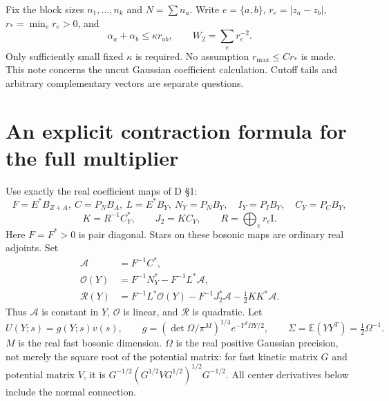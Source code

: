 \documentclass[11pt,letterpaper]{article}
\newcommand{\E}{\mathbb E}
\newcommand{\calA}{\mathcal A}
\newcommand{\calO}{\mathcal O}
\newcommand{\calR}{\mathcal R}
\newcommand{\Id}{\mathrm I}
\begin{document}
Fix the block sizes $n_1,\ldots,n_k$ and $N=\sum n_a$. Write $e=\{a,b\}$, $r_e=|z_a-z_b|$, $r_*=\min_e r_e>0$, and
\[
 \alpha_a+\alpha_b\le\kappa r_{ab},\qquad W_2=\sum_e r_e^{-2}.
\]
Only sufficiently small fixed $\kappa$ is required. No assumption $r_{\max}\le C r_*$ is made. This note concerns the uncut Gaussian coefficient calculation. Cutoff tails and arbitrary complementary vectors are separate questions.

\section{An explicit contraction formula for the full multiplier}
Use exactly the real coefficient maps of D \S1:
\[
 F=E^*B_{Z+A},\ C=P_NB_A,\ L=E^*B_Y,\ N_Y=P_NB_Y,
 \quad I_Y=P_IB_Y,\quad C_Y=P_CB_Y,
\]
\[
 K=R^{-1}C_Y^*,\qquad J_2=KC_Y,\qquad R=\bigoplus_e r_e\Id.
\]
Here $F=F^*>0$ is pair diagonal. Stars on these bosonic maps are ordinary real adjoints. Set
\begin{align}
 \calA&=F^{-1}C^*,\\
 \calO(Y)&=F^{-1}N_Y^*-F^{-1}L^*\calA,\\
 \calR(Y)&=F^{-1}L^*\calO(Y)-F^{-1}J_2^*\calA
                  -\tfrac12 KK^*\calA. \label{eq:R}
\end{align}
Thus $\calA$ is constant in $Y$, $\calO$ is linear, and $\calR$ is quadratic. Let
\[
 U(Y;s)=g(Y;s)v(s),\qquad
 g=(\det\Omega/\pi^M)^{1/4}e^{-Y^T\Omega Y/2},\qquad
 \Sigma=\E(YY^T)=\tfrac12\Omega^{-1}.
\]
$M$ is the real fast bosonic dimension. $\Omega$ is the real positive Gaussian precision, not merely the square root of the potential matrix: for fast kinetic matrix $G$ and potential matrix $V$, it is
$G^{-1/2}(G^{1/2}VG^{1/2})^{1/2}G^{-1/2}$. All center derivatives below include the normal connection.
\end{document}
